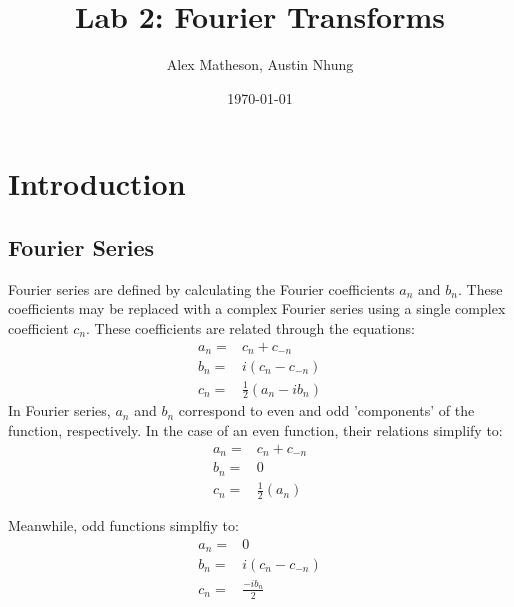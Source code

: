 \documentclass[twocolumn]{article}
\begin{document}
\title{Lab 2: Fourier Transforms}
\author{Alex Matheson, Austin Nhung}
\date{\today}
\maketitle

\section{Introduction}

\subsection{Fourier Series}
Fourier series are defined by calculating the Fourier coefficients $a_n$ and
$b_n$. These coefficients may be replaced with a complex Fourier series using
a single complex coefficient $c_n$. These coefficients are related through the
equations:
\begin{equation}
\begin{split}
a_n =& c_n + c_{-n} \\
b_n =& i(c_n - c_{-n}) \\
c_n =& \frac{1}{2}(a_n - ib_n)
\end{split}
\end{equation}
In Fourier series, $a_n$ and $b_n$ correspond to even and odd 'components' of
the function, respectively. In the case of an even function, their relations
simplify to:
\begin{equation}
\begin{split}
a_n =& c_n + c_{-n} \\
b_n =& 0 \\
c_n =& \frac{1}{2}(a_n)
\end{split}
\end{equation}

Meanwhile, odd functions simplfiy to:
\begin{equation}
\begin{split}
a_n =& 0 \\
b_n =& i(c_n - c_{-n}) \\
c_n =& \frac{-ib_n}{2}
\end{split}
\end{equation} 
 
\end{document}

